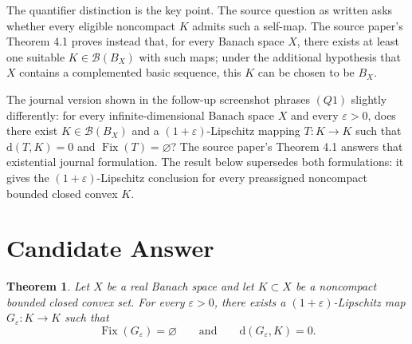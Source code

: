 \documentclass[11pt]{article}
\newtheorem{theorem}{Theorem}
\newcommand{\Fix}{\operatorname{Fix}}
\begin{document}
The quantifier distinction is the key point.  The source question as written
asks whether every eligible noncompact \(K\) admits such a self-map.  The
source paper's Theorem 4.1 proves instead that, for every Banach space \(X\),
there exists at least one suitable \(K\in\mathcal B(B_X)\) with such maps;
under the additional hypothesis that \(X\) contains a complemented basic
sequence, this \(K\) can be chosen to be \(B_X\).

The journal version shown in the follow-up screenshot phrases \((Q1)\)
slightly differently: for every infinite-dimensional Banach space \(X\) and
every \(\varepsilon>0\), does there exist
\(K\in\mathcal B(B_X)\) and a \((1+\varepsilon)\)-Lipschitz mapping
\(T:K\to K\) such that \(\mathrm d(T,K)=0\) and
\(\Fix(T)=\varnothing\)?  The source paper's Theorem 4.1 answers that
existential journal formulation.  The result below supersedes both formulations:
it gives the \((1+\varepsilon)\)-Lipschitz conclusion for every preassigned
noncompact bounded closed convex \(K\).

\section*{Candidate Answer}

\begin{theorem}
Let \(X\) be a real Banach space and let \(K\subset X\) be a noncompact
bounded closed convex set.  For every \(\varepsilon>0\), there exists a
\((1+\varepsilon)\)-Lipschitz map \(G_\varepsilon:K\to K\) such that
\[
\Fix(G_\varepsilon)=\varnothing
\qquad\text{and}\qquad
\mathrm d(G_\varepsilon,K)=0 .
\]
\end{theorem}
\end{document}
